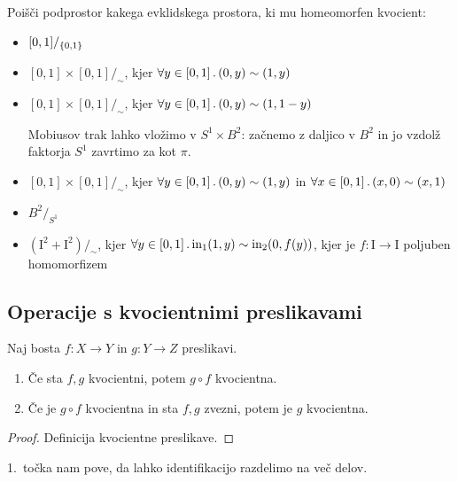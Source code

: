 \begin{primer}
    Poišči podprostor kakega evklidskega prostora, ki mu homeomorfen kvocient:
    \begin{itemize}
        \item \([0,1]/_{\left\{0, 1\right\}}\)
        \item \([0,1] \times [0,1]/_\sim\), kjer \(\forall y \in [0,1] \,.\, (0, y) \sim (1, y)\)
        \item \([0,1] \times [0,1]/_\sim\), kjer \(\forall y \in [0,1] \,.\, (0, y) \sim (1, 1- y)\)
        \begin{opomba}
            Mobiusov trak lahko vložimo v \(S^1 \times B^2\): začnemo z daljico v \(B^2\) in jo vzdolž faktorja \(S^1\) zavrtimo za kot \(\pi\).
        \end{opomba}
        \item \([0,1] \times [0,1]/_\sim\), kjer \(\forall y \in [0,1] \,.\, (0, y) \sim (1, y)\) in \(\forall x \in [0,1] \,.\, (x, 0) \sim (x, 1)\)
        \item \(B^2/_{S^1}\)
        \item \((\text{I}^2 + \text{I}^2)/_\sim\), kjer \(\forall y \in [0,1] \,.\, \text{in}_1 (1, y) \sim \text{in}_2 (0, f(y))\), kjer je \(f: \text{I} \to \text{I}\) poljuben homomorfizem
    \end{itemize}
\end{primer}

\subsection{Operacije s kvocientnimi preslikavami}
\begin{trditev}
    Naj bosta \(f: X \to Y\) in \(g: Y \to Z\) preslikavi.
    \begin{enumerate}
        \item Če sta \(f, g\) kvocientni, potem \(g \circ f\) kvocientna.
        \item Če je \(g \circ f\) kvocientna in sta \(f, g\) zvezni, potem je \(g\) kvocientna.
    \end{enumerate}
\end{trditev}

\begin{proof}
    Definicija kvocientne preslikave.
\end{proof}

\begin{opomba}
    1.\ točka nam pove, da lahko identifikacijo razdelimo na več delov.
\end{opomba}

